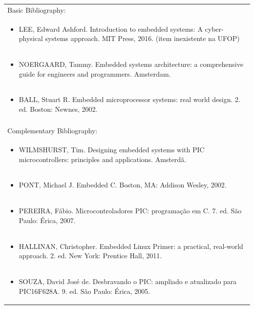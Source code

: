 \documentclass[11pt]{article}
\begin{document}
\begin{center}
\begin{longtable}{|p{4cm}|p{4cm}|p{4cm}|p{4cm}|}
\hline
\multicolumn{4}{|p{16cm}|}{Basic Bibliography:}\\*
\multicolumn{4}{|p{\dimexpr 16cm + 6\tabcolsep\relax}|}{\begin{itemize}\item LEE, Edward Ashford. Introduction to embedded systems: A cyber-physical systems approach. MIT Press, 2016. (item inexistente na UFOP)\end{itemize}}\\
\multicolumn{4}{|p{\dimexpr 16cm + 6\tabcolsep\relax}|}{\begin{itemize}\item NOERGAARD, Tammy. Embedded systems architecture: a comprehensive guide for engineers and programmers. Amsterdam.\end{itemize}}\\
\multicolumn{4}{|p{\dimexpr 16cm + 6\tabcolsep\relax}|}{\begin{itemize}\item BALL, Stuart R. Embedded microprocessor systems: real world design. 2. ed. Boston: Newnes, 2002.\end{itemize}}\\
\multicolumn{4}{|p{16cm}|}{}\\
\hline
\multicolumn{4}{|p{16cm}|}{Complementary Bibliography:}\\*
\multicolumn{4}{|p{\dimexpr 16cm + 6\tabcolsep\relax}|}{\begin{itemize}\item WILMSHURST, Tim. Designing embedded systems with PIC microcontrollers: principles and applications. Amsterdã.\end{itemize}}\\
\multicolumn{4}{|p{\dimexpr 16cm + 6\tabcolsep\relax}|}{\begin{itemize}\item PONT, Michael J. Embedded C. Boston, MA: Addison Wesley, 2002.\end{itemize}}\\
\multicolumn{4}{|p{\dimexpr 16cm + 6\tabcolsep\relax}|}{\begin{itemize}\item PEREIRA, Fábio. Microcontroladores PIC: programação em C. 7. ed. São Paulo: Érica, 2007.\end{itemize}}\\
\multicolumn{4}{|p{\dimexpr 16cm + 6\tabcolsep\relax}|}{\begin{itemize}\item HALLINAN, Christopher. Embedded Linux Primer: a practical, real-world approach. 2. ed. New York: Prentice Hall, 2011.\end{itemize}}\\
\multicolumn{4}{|p{\dimexpr 16cm + 6\tabcolsep\relax}|}{\begin{itemize}\item SOUZA, David José de. Desbravando o PIC: ampliado e atualizado para PIC16F628A. 9. ed. São Paulo: Érica, 2005.\end{itemize}}\\
\hline
\end{longtable}
\end{center}
\end{document}
